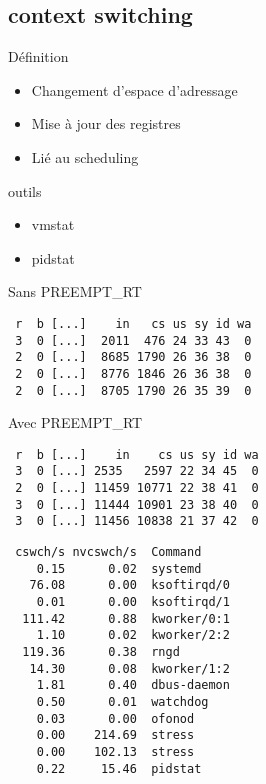\subsection{context switching}
\begin{frame}
	\begin{block}{Définition}
		\begin{itemize}
			\item Changement d'espace d'adressage
			\item Mise à jour des registres
			\item Lié au scheduling
		\end{itemize}
	\end{block}
	\begin{block}{outils}
		\begin{itemize}
			\item vmstat
			\item pidstat
		\end{itemize}
	\end{block}
\end{frame}
\begin{frame}[containsverbatim]
	\begin{block}{Sans PREEMPT\_RT}
\begin{verbatim}
 r  b [...]    in   cs us sy id wa
 3  0 [...]  2011  476 24 33 43  0
 2  0 [...]  8685 1790 26 36 38  0
 2  0 [...]  8776 1846 26 36 38  0
 2  0 [...]  8705 1790 26 35 39  0
\end{verbatim}
	\end{block}
	\begin{block}{Avec PREEMPT\_RT}
\begin{verbatim}
 r  b [...]    in    cs us sy id wa
 3  0 [...] 2535   2597 22 34 45  0
 2  0 [...] 11459 10771 22 38 41  0
 3  0 [...] 11444 10901 23 38 40  0
 3  0 [...] 11456 10838 21 37 42  0
\end{verbatim}
	\end{block}
\end{frame}


\begin{frame}[containsverbatim]
\begin{verbatim}
 cswch/s nvcswch/s  Command
    0.15      0.02  systemd
   76.08      0.00  ksoftirqd/0
    0.01      0.00  ksoftirqd/1
  111.42      0.88  kworker/0:1
    1.10      0.02  kworker/2:2
  119.36      0.38  rngd
   14.30      0.08  kworker/1:2
    1.81      0.40  dbus-daemon
    0.50      0.01  watchdog
    0.03      0.00  ofonod
    0.00    214.69  stress
    0.00    102.13  stress
    0.22     15.46  pidstat
\end{verbatim}
\end{frame}


